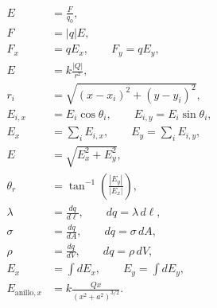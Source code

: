 \begin{align*}
E &= \frac{F}{q_0},\\
F &= |q|E,\\
F_x &= qE_x, \qquad F_y=qE_y,\\
E &= k\frac{|Q|}{r^2},\\
r_i &= \sqrt{(x-x_i)^2+(y-y_i)^2},\\
E_{i,x} &= E_i\cos\theta_i, \qquad E_{i,y}=E_i\sin\theta_i,\\
E_x &= \sum_iE_{i,x}, \qquad E_y=\sum_iE_{i,y},\\
E &= \sqrt{E_x^2+E_y^2},\\
\theta_r &= \tan^{-1}\left(\frac{|E_y|}{|E_x|}\right),\\
\lambda &= \frac{dq}{d\ell}, \qquad dq=\lambda\,d\ell,\\
\sigma &= \frac{dq}{dA}, \qquad dq=\sigma\,dA,\\
\rho &= \frac{dq}{dV}, \qquad dq=\rho\,dV,\\
E_x &= \int dE_x, \qquad E_y=\int dE_y,\\
E_{\text{anillo},x} &= k\frac{Qx}{(x^2+a^2)^{3/2}}.
\end{align*}